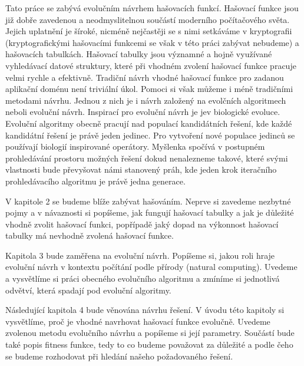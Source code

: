 


Tato práce se zabývá evolučním návrhem hašovacích funkcí. Hašovací 
funkce jsou již dobře zavedenou a neodmyslitelnou součástí moderního
počítačového světa. Jejich uplatnění je šíroké, nicméně nejčastěji se s
nimi setkáváme v kryptografii (kryptografickými hašovacími funkcemi se
však v této práci zabývat nebudeme) a hašovacích tabulkách. Hašovací
tabulky jsou významné a hojně využívané vyhledávací datové struktury, 
které při vhodném zvolení hašovací funkce pracuje velmi rychle a 
efektivně. Tradiční návrh vhodné hašovací funkce pro zadanou aplikační 
doménu není triviální úkol. Pomoci si však můžeme i méně tradičními 
metodami návrhu. Jednou z nich je i návrh založený na evolčních 
algoritmech neboli evoluční návrh. Inspirací pro evoluční návrh je jev 
biologické evoluce. Evoluční algoritmy obecně pracují nad populací 
kandidátních řešení, kde každé kandidátní řešení je právě jeden jedinec. 
Pro vytvoření nové populace jedinců se používají 
biologií inspirované operátory. Myšlenka spočívá v postupném prohledávání 
prostoru možných řešení dokud nenalezneme takové, které svými vlastnosti 
bude převyšovat námi stanovený práh, kde jeden krok iteračního 
prohledávacího algoritmu je právě jedna generace.

V kapitole 2 se budeme blíže zabývat hašováním. Neprve si zavedeme 
nezbytné pojmy a v návaznosti si popíšeme, jak fungují hašovací tabulky a 
jak je důležité vhodně zvolit hašovací funkci, popřípadě jaký dopad na 
výkonnost hašovací tabulky má nevhodně zvolená hašovací funkce.

Kapitola 3 bude zaměřena na evoluční návrh. Popíšeme si, jakou roli hraje
evoluční návrh v kontextu počítání podle přírody (natural computing).
Uvedeme a vysvětlíme si práci obecného evolučního algoritmu a zmíníme
si jednotlivá odvětví, která spadají pod evoluční algoritmy. 

Následující kapitola 4 bude věnována návrhu řešení. V úvodu této kapitoly 
si vysvětlíme, proč je vhodné navrhovat hašovací funkce evolučně. Uvedeme 
zvolenou metodu evolučního návrhu a popíšeme si její parametry. Součástí 
bude také popis fitness funkce, tedy to co budeme považovat za důležité a 
podle čeho se budeme rozhodovat při hledání našeho požadovaného řešení.

